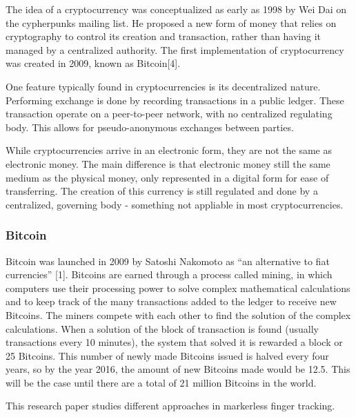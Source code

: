\documentclass{acm_proc_article-sp}
\begin{document}
The idea of a cryptocurrency was conceptualized as early as 1998 by Wei Dai on the cypherpunks mailing list. He proposed a new form of money that relies on cryptography to control its creation and transaction, rather than having it managed by a centralized authority. The first implementation of cryptocurrency was created in 2009, known as Bitcoin[4].


One feature typically found in cryptocurrencies is its decentralized nature. Performing exchange is done by recording transactions in a public ledger. These transaction operate on a peer-to-peer network, with no centralized regulating body. This allows for pseudo-anonymous exchanges between parties.

While cryptocurrencies arrive in an electronic form, they are not the same as electronic money. The main difference is that electronic money still the same medium as the physical money, only represented in a digital form for ease of transferring. The creation of this currency is still regulated and done by a centralized, governing body - something not appliable in most cryptocurrencies.


\subsubsection{Bitcoin}

Bitcoin was launched in 2009 by Satoshi Nakomoto as “an alternative to fiat currencies” [1]. Bitcoins are earned through a process called mining, in which computers use their processing power to solve complex mathematical calculations and to keep track of the many transactions added to the ledger to receive new Bitcoins. The miners compete with each other to find the solution of the complex calculations.  When a solution of the block of transaction is found (usually transactions every 10 minutes), the system that solved it is rewarded a block or 25 Bitcoins. This number of newly made Bitcoins issued is halved every four years, so by the year 2016, the amount of new Bitcoins made would be 12.5. This will be the case until there are a total of 21 million Bitcoins in the world.

This research paper studies different approaches in markerless finger tracking.

\end{document}
